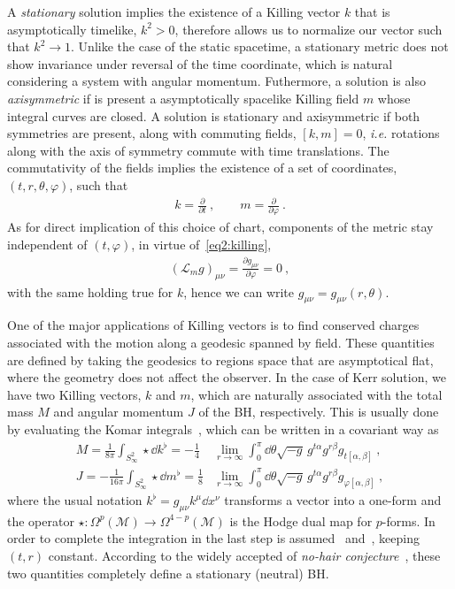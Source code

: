 A \emph{stationary} solution implies the existence of a Killing vector $k$ that is asymptotically timelike, $k^2>0$, therefore allows us to normalize our vector such that $k^2 \rightarrow 1$. 
Unlike the case of the static spacetime, a stationary metric does not show invariance under reversal of the time coordinate, which is natural considering a system with angular momentum. 
Futhermore, a solution is also \emph{axisymmetric} if is present a asymptotically spacelike Killing field $m$ whose integral curves are closed.
A solution is stationary and axisymmetric if both symmetries are present, along with commuting fields, $[k , m] = 0$, \emph{i.e.} rotations along with the axis of symmetry commute with time translations. The commutativity of the fields implies the existence of a set of coordinates, $(t,r,\theta,\varphi)$, such that
\begin{align}
    k = \frac{\partial}{\partial t} ~, \qquad m = \frac{\partial}{\partial \varphi} ~.
    \label{eq2:tPhiKilling}
\end{align}
As for direct implication of this choice of chart, components of the metric stay independent of $(t,\varphi)$, in virtue of~\eqref{eq2:killing},
\begin{align}
    (\mathscr{L}_m g)_{\mu\nu} = \frac{\partial g_{\mu\nu}}{\partial \varphi} = 0 ~,
    \label{eq2:lieMetricTPhi}
\end{align}
with the same holding true for $k$, hence we can write $g_{\mu\nu} = g_{\mu\nu}(r,\theta)$. 

One of the major applications of Killing vectors is to find conserved charges associated with the motion along a geodesic spanned by field.
These quantities are defined by taking the geodesics to regions space that are asymptotical flat, where the geometry does not affect the observer.
In the case of Kerr solution, we have two Killing vectors, $k$ and $m$, which are naturally associated with the total mass $M$ and angular momentum $J$ of the BH, respectively.
This is usually done by evaluating the Komar integrals~\cite{Heusler1996, Wald2010}, which can be written in a covariant way as
\begin{align}
    M = \frac{1}{8 \pi} \int_{S^2_\infty} \star \dd k^\flat  =  -\frac{1}{4}& \lim_{r\to\infty}  \int_0^\pi \dd\theta \sqrt{-g} \, g^{t\alpha} g^{r\beta} g_{t[\alpha,\beta]} ~, \label{eq2:komarMass} \\
    J = -\frac{1}{16 \pi} \int_{S^2_\infty} \star \dd m^\flat = \frac{1}{8}& \lim_{r\to\infty}  \int_0^\pi \dd\theta \sqrt{-g} \, g^{t\alpha} g^{r\beta} g_{\varphi[\alpha,\beta]} ~, \label{eq2:komarSpin}
\end{align}
where the usual notation $k^\flat = g_{\mu\nu} k^\mu \dd x^\nu$ transforms a vector into a one-form and the operator $\star : \Omega^{p}(\mathscr{M})\to\Omega^{4-p}(\mathscr{M})$ is the Hodge dual map for $p$-forms.
In order to complete the integration in the last step is assumed~ and~, keeping $(t,r)$ constant. 
According to the widely accepted of \emph{no-hair conjecture}~\cite{Carter1971}, these two quantities completely define a stationary (neutral) BH. 

